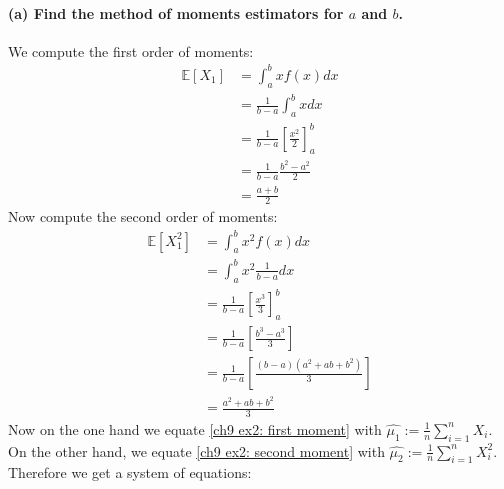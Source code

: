 \documentclass{article}
\newcommand{\E}{\mathbb{E}}
\begin{document}
\paragraph{(a) Find the method of moments estimators for $a$ and $b$.\\}
We compute the first order of moments:
\begin{align}
    \nonumber
    \E[X_1]
     & = \int_a^b x f(x) dx                            \\
    \nonumber
     & = \frac{1}{b-a} \int_a^b x dx                   \\
    \nonumber
     & = \frac{1}{b-a} \left[ \frac{x^2}{2}\right]_a^b \\
    \nonumber
     & = \frac{1}{b-a} \frac{b^2 - a^2}{2}             \\
    \label{ch9 ex2: first moment}
     & = \frac{a + b}{2}
\end{align}
Now compute the second order of moments:
\begin{align}
    \nonumber
    \E[X_1^2]
     & = \int_{a}^{b} x^2 f (x) dx                                                          \\
    \nonumber
     & = \int_{a}^{b} x^2 \frac{1}{b-a} dx                                                  \\
    \nonumber
     & = \frac{1}{b-a} \left[ \frac{x^3}{3} \right]_{a}^{b}                                 \\
    \nonumber
     & = \frac{1}{b-a} \left[ \frac{b^3 - a^3}{3} \right]                                   \\
    \nonumber
     & = \frac{1}{b-a} \left[\frac{\left(b - a\right)\left(a^2 + ab + b^2\right)}{3}\right] \\
    \label{ch9 ex2: second moment}
     & = \frac{a^2 + ab + b^2}{3}
\end{align}
Now on the one hand we equate \eqref{ch9 ex2: first moment} with \(\hat{\mu_1} := \frac{1}{n} \sum_{i=1}^n X_i\). On the other hand, we equate \eqref{ch9 ex2: second moment} with \(\hat{\mu_2} := \frac{1}{n}\sum_{i=1}^n X_i^2\). Therefore we get a system of equations:
\end{document}
